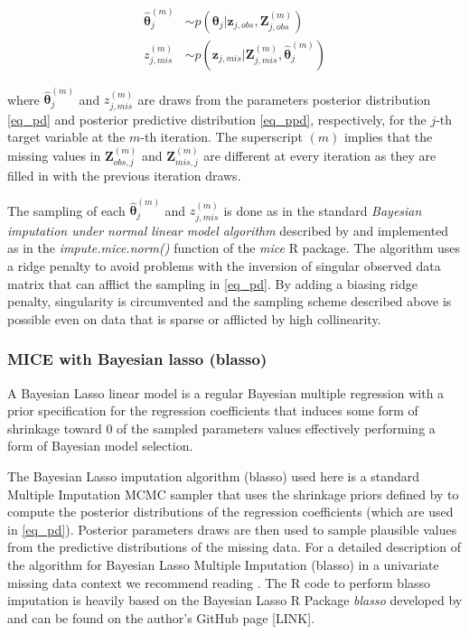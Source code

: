 	\begin{align}
	\hat{\bm{\theta}}_{j}^{(m)} &\sim p(\bm{\theta}_j | \bm{z}_{j, obs}, \bm{Z}_{j, obs}^{(m)}) \label{eq_pd}\\
	z_{j, mis}^{(m)} &\sim p(\bm{z}_{j, mis} | \bm{Z}_{j, mis}^{(m)}, \hat{\bm{\theta}}_{j}^{(m)}) \label{eq_ppd}
	\end{align}

	where $\hat{\bm{\theta}}_{j}^{(m)}$ and $z_{j, mis}^{(m)}$ are draws from the parameters posterior distribution 
	\eqref{eq_pd} and posterior predictive distribution \eqref{eq_ppd}, respectively, for the $j$-th target variable 
	at the $m$-th iteration. The superscript $(m)$ implies that the missing values in $\bm{Z}_{obs, j}^{(m)}$
	and $\bm{Z}_{mis, j}^{(m)}$ are different at every iteration as they are filled in with the previous iteration 
	draws.

	The sampling of each $\hat{\bm{\theta}}_{j}^{(m)}$ and $z_{j, mis}^{(m)}$ is done as in the standard 
	\emph{Bayesian imputation under normal linear model algorithm} described by 
	\citep[p. 68, algorithm 3.1]{vanBuuren:2012} and implemented as in the \emph{impute.mice.norm()} 
	function of the \emph{mice} R package.
	The algorithm uses a ridge penalty to avoid problems with the inversion of singular observed data matrix that
	can afflict the sampling in \eqref{eq_pd}.
	By adding a biasing ridge penalty, singularity is circumvented and the sampling scheme described above is 
	possible even on data that is sparse or afflicted by high collinearity.

\subsubsection{MICE with Bayesian lasso (blasso)}
	A Bayesian Lasso linear model is a regular Bayesian multiple regression with a prior specification for the 
	regression coefficients that induces some form of shrinkage toward 0 of the sampled parameters values 
	\citep{parkCasella:2008, hans:2009} effectively performing a form of Bayesian model selection.

	The Bayesian Lasso imputation algorithm (blasso) used here is a standard Multiple Imputation MCMC sampler 
	that uses the shrinkage priors defined by \citet{hans:2010} to compute the posterior distributions of the 
	regression coefficients (which are used in \eqref{eq_pd}). 
	Posterior parameters draws are then used to sample plausible values from the predictive distributions of 
	the missing data.
	For a detailed description of the algorithm for Bayesian Lasso Multiple Imputation (blasso) in a univariate
	missing data context we recommend reading \cite{zhaoLong:2016}.
	The R code to perform blasso imputation is heavily based on the Bayesian Lasso R Package \emph{blasso} 
	developed by \citet{hans:2010} and can be found on the author's GitHub page [LINK].

